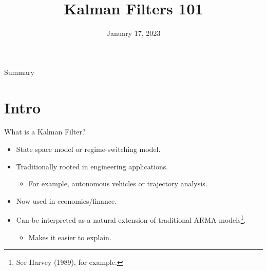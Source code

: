 \documentclass[dvipsnames,mathserif]{beamer}
\begin{document}
\rightskip\rightmargin
\title{Kalman Filters 101}
\author{ \Large \textbf{} }
\footnotesize{\date{January 17, 2023 }


\begin{frame}
	\maketitle
\end{frame}

\begin{frame}{Summary}
	\footnotesize \tableofcontents
\end{frame}

\section{Intro}

\begin{frame}{What is a Kalman Filter?}
    \begin{itemize}
    	\item State space model or regime-switching model.
	\item Traditionally rooted in engineering applications.
	\begin{itemize}
		\item For example, autonomous vehicles or trajectory analysis.
	\end{itemize}
	\item Now used in economics/finance.
	\item Can be interpreted as a natural extension of traditional ARMA models\footnote{\tiny See Harvey (1989), for example.}.
	\begin{itemize}
		\item Makes it easier to explain.
	\end{itemize}
    \end{itemize}
\end{frame}


}
\end{document}
